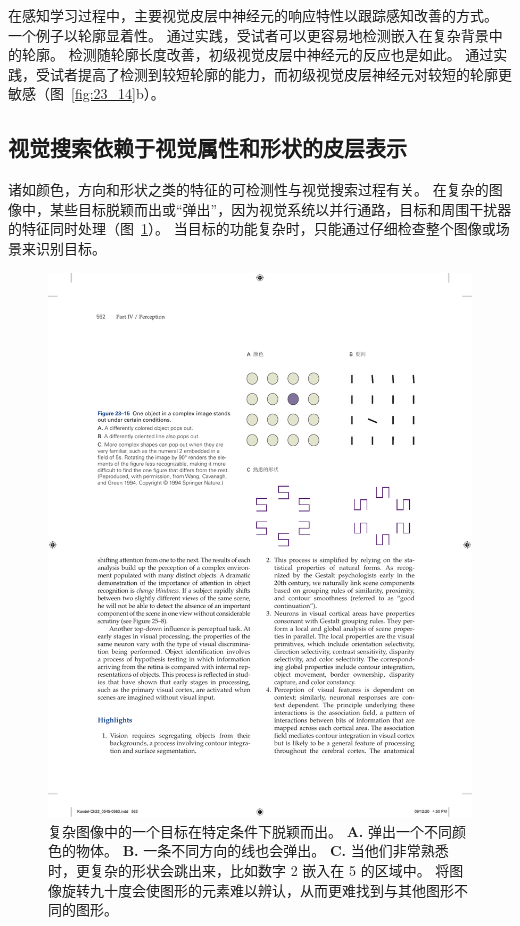 在感知学习过程中，主要视觉皮层中神经元的响应特性以跟踪感知改善的方式。
一个例子以轮廓显着性。
通过实践，受试者可以更容易地检测嵌入在复杂背景中的轮廓。
检测随轮廓长度改善，初级视觉皮层中神经元的反应也是如此。
通过实践，受试者提高了检测到较短轮廓的能力，而初级视觉皮层神经元对较短的轮廓更敏感（图~\ref{fig:23_14}b）。



\subsection{视觉搜索依赖于视觉属性和形状的皮层表示}

诸如颜色，方向和形状之类的特征的可检测性与视觉搜索过程有关。
在复杂的图像中，某些目标脱颖而出或“弹出”，因为视觉系统以并行通路，目标和周围干扰器的特征同时处理（图~\ref{fig:23_15}）。
当目标的功能复杂时，只能通过仔细检查整个图像或场景来识别目标。


\begin{figure}[htbp]
	\centering
	\includegraphics[width=0.75\linewidth]{chap23/fig_23_15}
	\caption{复杂图像中的一个目标在特定条件下脱颖而出。
		\textbf{A.} 弹出一个不同颜色的物体。
		\textbf{B.} 一条不同方向的线也会弹出。
		\textbf{C.} 当他们非常熟悉时，更复杂的形状会跳出来，比如数字 2 嵌入在 5 的区域中。
		将图像旋转九十度会使图形的元素难以辨认，从而更难找到与其他图形不同的图形\cite{wang1994familiarity}。}
	\label{fig:23_15}
\end{figure}


